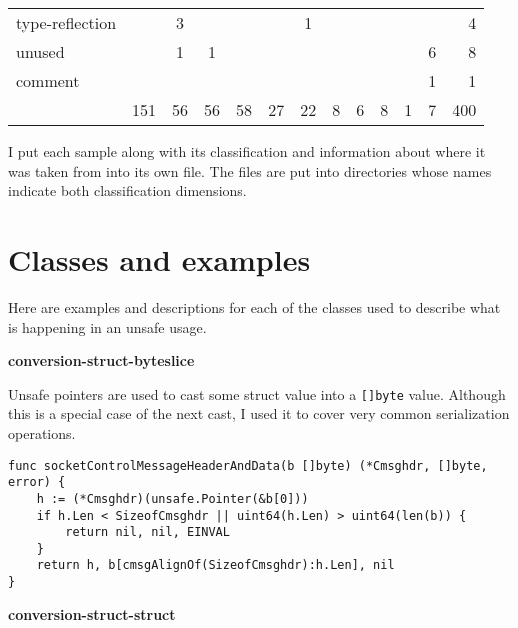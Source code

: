 \begin{table}[h]
\begin{tabularx}{\textwidth}{Xccccccccccc|r}
        \rowcolor{verylightgray}
                          type-reflection &       &   3 &     &      &     &   1 &    &     &    &    &    &    4 \\
                                   unused &       &   1 &   1 &      &     &     &    &     &    &    &  6 &    8 \\
        \rowcolor{verylightgray}
                                  comment &       &     &     &      &     &     &    &     &    &    &  1 &    1 \\ \hline
                                       {} &   151 &  56 &  56 &   58 &  27 &  22 &  8 &   6 &  8 &  1 &  7 &  400 \\
        \bottomrule
    \end{tabularx}
\end{table}

I put each sample along with its classification and information about where it was taken from into its own file.
The files are put into directories whose names indicate both classification dimensions.



\section{Classes and examples}\label{sec:survey-small-classes}

Here are examples and descriptions for each of the classes used to describe what is happening in an unsafe usage.

\textbf{conversion-struct-byteslice}

Unsafe pointers are used to cast some struct value into a \texttt{[]byte} value.
Although this is a special case of the next cast, I used it to cover very common serialization operations.

\begin{lstlisting}[language=Golang, label=lst:survey-small-classexample-conversion-struct-byteslice, caption=Usage class example: conversion-struct-byteslice]
func socketControlMessageHeaderAndData(b []byte) (*Cmsghdr, []byte, error) {
    h := (*Cmsghdr)(unsafe.Pointer(&b[0]))
    if h.Len < SizeofCmsghdr || uint64(h.Len) > uint64(len(b)) {
        return nil, nil, EINVAL
    }
    return h, b[cmsgAlignOf(SizeofCmsghdr):h.Len], nil
}
\end{lstlisting}


\textbf{conversion-struct-struct}


